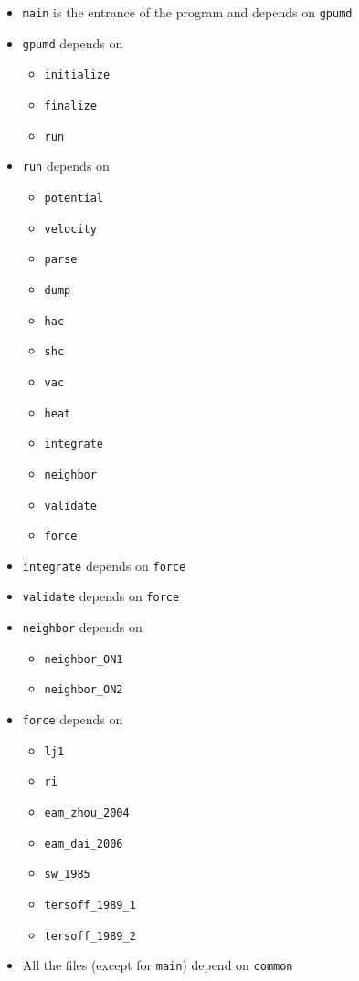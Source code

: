 \documentclass[12pt,a4paper]{report}
\begin{document}
\begin{itemize}
\item \verb"main" is the entrance of the program and depends on \verb"gpumd"
\item \verb"gpumd" depends on
  \begin{itemize}
    \item \verb"initialize"
    \item \verb"finalize"
    \item \verb"run"
  \end{itemize}
\item \verb"run" depends on
      \begin{itemize}
      \item \verb"potential"
      \item \verb"velocity"
      \item \verb"parse"
      \item \verb"dump"
      \item \verb"hac"
      \item \verb"shc"
      \item \verb"vac"
      \item \verb"heat"
      \item \verb"integrate"
      \item \verb"neighbor"
      \item \verb"validate"
      \item \verb"force"
      \end{itemize}
  \item \verb"integrate" depends on \verb"force"
  \item \verb"validate" depends on \verb"force"
  \item \verb"neighbor" depends on
        \begin{itemize}
        \item \verb"neighbor_ON1"
        \item \verb"neighbor_ON2"
        \end{itemize}
  \item \verb"force" depends on
        \begin{itemize}
        \item \verb"lj1"
        \item \verb"ri"
        \item \verb"eam_zhou_2004"
        \item \verb"eam_dai_2006"
        \item \verb"sw_1985"
        \item \verb"tersoff_1989_1"
        \item \verb"tersoff_1989_2"
        \end{itemize}
\item All the files (except for \verb"main") depend on \verb"common"
\end{itemize}
\end{document}
